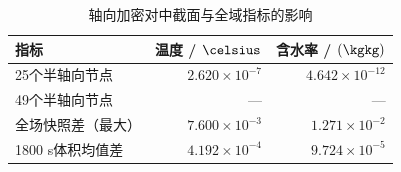 \begin{table}[H]
\centering\small
\caption{轴向加密对中截面与全域指标的影响}\label{tab:axial}
\begin{tabular}{lrr}
\toprule
指标 & 温度 / $\celsius$ & 含水率 / $(\kgkg)$\\
\midrule
25个半轴向节点 & $2.620\times10^{-7}$ & $4.642\times10^{-12}$ \\
49个半轴向节点 & — & — \\
全场快照差（最大） & $7.600\times10^{-3}$ & $1.271\times10^{-2}$ \\
1800 s体积均值差 & $4.192\times10^{-4}$ & $9.724\times10^{-5}$ \\
\bottomrule
\end{tabular}
\end{table}
